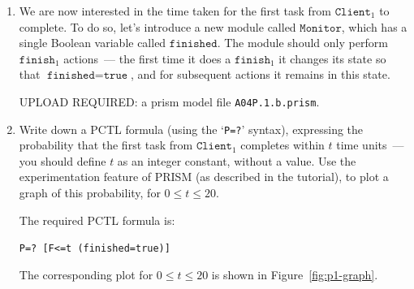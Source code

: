 \documentclass[12pt,a4paper]{article}
\begin{document}
\begin{description}
\begin{enumerate}[label=\alph*)]
\begin{itemize}
\begin{itemize}
    \end{itemize}
    \item \textbf{Non-Determinism and Ties:} Because jobs can have equal tickets, guards overlap. This non-determinism is naturally resolved by PRISM's underlying uniform distribution, which simulates a fair lottery draw among the tied jobs.
\end{itemize}
\color{black}
\fi
\color{red} \par UPLOAD REQUIRED: a prism model file \texttt{A04P.1.a.prism}.\color{black}
%
\item We are now interested in the time taken for the first task from $\texttt{Client}_1$ to complete. To do so, let's introduce a new module called
$\texttt{Monitor}$, which has a single Boolean variable called $\texttt{finished}$. The module should only perform $\texttt{finish}_1$
actions~--- the first time it does a $\texttt{finish}_1$ it changes its state so that $\texttt{finished} = \texttt{true}$, and for subsequent actions
it remains in this state.
%
\ifwithanswers
\color{black}
\fi
\color{red} \par UPLOAD REQUIRED: a prism model file  \texttt{A04P.1.b.prism}.\color{black}
%
\item Write down a PCTL formula (using the `{\tt P=?}' syntax), expressing the probability that the first task from $\texttt{Client}_1$
completes within $t$ time units~--- you should define $t$ as an integer constant, without a value.
Use the experimentation feature of PRISM (as described in the tutorial), to plot a graph of this probability, for $0 \le t \le 20$.
%
\ifwithanswers
\color{blue}
\par
The required PCTL formula is:
\begin{center}
\texttt{P=? [F<=t (finished=true)]}
\end{center}
The corresponding plot for $0 \leq t \leq 20$ is shown in Figure~\ref{fig:p1-graph}.


\end{enumerate}
\end{description}
\end{document}
